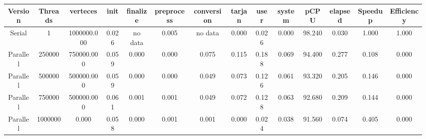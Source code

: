 \begin{tabular}{|c|c|c|c|c|c|c|c|c|c|c|c|c|c|}
\toprule
 Version &  Threads &    verteces &  init & finalize &  preprocess & conversion &  tarjan &  user &  system &   pCPU &  elapsed &  Speedup &  Efficiency \\
\midrule
  Serial &        1 & 1000000.000 & 0.026 &  no data &       0.005 &    no data &   0.000 & 0.026 &   0.000 & 98.240 &    0.030 &    1.000 &       1.000 \\
Parallel &   250000 &  750000.000 & 0.059 &    0.000 &       0.000 &      0.075 &   0.115 & 0.188 &   0.069 & 94.400 &    0.277 &    0.108 &       0.000 \\
Parallel &   500000 &  500000.000 & 0.059 &    0.000 &       0.000 &      0.049 &   0.073 & 0.126 &   0.061 & 93.320 &    0.205 &    0.146 &       0.000 \\
Parallel &   750000 &  500000.000 & 0.061 &    0.001 &       0.001 &      0.049 &   0.072 & 0.128 &   0.063 & 92.680 &    0.209 &    0.144 &       0.000 \\
Parallel &  1000000 &       0.000 & 0.058 &    0.000 &       0.001 &      0.001 &   0.000 & 0.024 &   0.038 & 91.560 &    0.074 &    0.405 &       0.000 \\
\bottomrule
\end{tabular}
